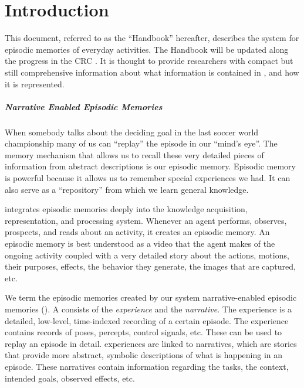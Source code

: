 \chapter{Introduction}

This document, referred to as the ``\neem Handbook'' hereafter,
describes the \ease system for episodic memories of everyday activities.
The \neem Handbook will be updated along the progress in the CRC \ease.
It is thought to provide \ease researchers with compact but still comprehensive
information about what information is contained in \neems, and how it is represented.

\paragraph{Narrative Enabled Episodic Memories}
When somebody talks about the deciding goal in the
last soccer world championship many of us can ``replay'' the episode in our ``mind's eye''.
The memory mechanism that allows us to recall these very detailed pieces of
information from abstract descriptions is our episodic memory.
Episodic memory is powerful because it allows us to remember special
experiences we had. It can also serve as a ``repository'' from which we learn general knowledge.

\ease integrates episodic memories deeply into the knowledge acquisition, representation, and processing
system. Whenever an agent performs, observes, prospects, and
reads about an activity, it creates an episodic memory. An episodic
memory is best understood as a video that the agent makes of the
ongoing activity coupled with a very detailed story about the actions, motions, their purposes, effects,
the behavior they generate, the images that are captured, etc.

We term the episodic memories created by our system narrative-enabled episodic memories (\neems).
A \neem consists of the \emph{\neem experience} and the \emph{\neem narrative}.
The \neem experience is a detailed, low-level, time-indexed recording
of a certain episode. The experience contains records of poses, percepts, control signals, etc.
These can be used to replay an episode in detail.
\neem experiences are linked to \neem narratives, which are stories
that provide more abstract, symbolic descriptions of what is happening in an episode.
These narratives contain information regarding the tasks, the context, intended goals, observed effects, etc.

